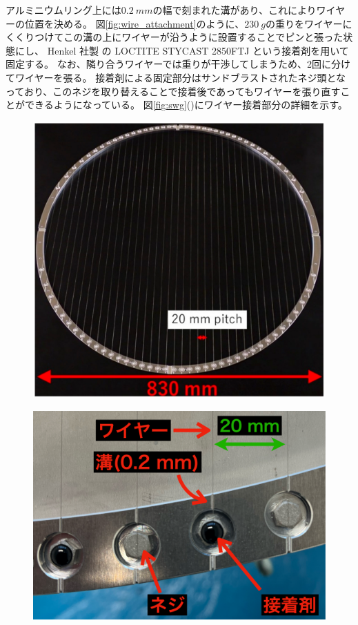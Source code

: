 \documentclass[../../main.tex]{subfiles}
\begin{document}
アルミニウムリング上には$\SI{0.2}{mm}$の幅で刻まれた溝があり、これによりワイヤーの位置を決める。
図\ref{fig:wire_attachment}のように、$\SI{230}{g}$の重りをワイヤーにくくりつけてこの溝の上にワイヤーが沿うように設置することでピンと張った状態にし、
Henkel 社製 の LOCTITE STYCAST 2850FTJ という接着剤を用いて固定する。
なお、隣り合うワイヤーでは重りが干渉してしまうため、2回に分けてワイヤーを張る。
接着剤による固定部分はサンドブラストされたネジ頭となっており、このネジを取り替えることで接着後であってもワイヤーを張り直すことができるようになっている。
図\ref{fig:swg}()にワイヤー接着部分の詳細を示す。
\begin{figure}[H]
    \begin{minipage}[b]{0.48\columnwidth}
        \centering
        \includegraphics[width=\columnwidth]{wiregrid/wiregrid_appearance.pdf}
        \subcaption{}
        \label{fig:wiregrid_appearance}
    \end{minipage}
    \hspace{0.02\columnwidth}
    \begin{minipage}[b]{0.48\columnwidth}
        \centering
        \includegraphics[width=\columnwidth]{wiregrid/wire_detail_view.pdf}

\end{minipage}
\end{figure}
\end{document}
